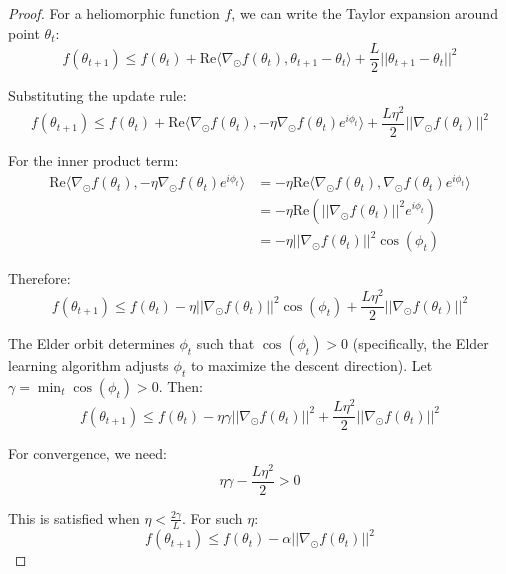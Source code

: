 \begin{proof}
For a heliomorphic function $f$, we can write the Taylor expansion around point $\theta_t$:
\begin{equation}
f(\theta_{t+1}) \leq f(\theta_t) + \text{Re}\langle \nabla_{\odot} f(\theta_t), \theta_{t+1} - \theta_t \rangle + \frac{L}{2}||\theta_{t+1} - \theta_t||^2
\end{equation}

Substituting the update rule:
\begin{equation}
f(\theta_{t+1}) \leq f(\theta_t) + \text{Re}\langle \nabla_{\odot} f(\theta_t), -\eta \nabla_{\odot} f(\theta_t) e^{i\phi_t} \rangle + \frac{L\eta^2}{2}||\nabla_{\odot} f(\theta_t)||^2
\end{equation}

For the inner product term:
\begin{align}
\text{Re}\langle \nabla_{\odot} f(\theta_t), -\eta \nabla_{\odot} f(\theta_t) e^{i\phi_t} \rangle &= -\eta \text{Re}\langle \nabla_{\odot} f(\theta_t), \nabla_{\odot} f(\theta_t) e^{i\phi_t} \rangle \\
&= -\eta \text{Re}\left(||\nabla_{\odot} f(\theta_t)||^2 e^{i\phi_t}\right) \\
&= -\eta ||\nabla_{\odot} f(\theta_t)||^2 \cos(\phi_t)
\end{align}

Therefore:
\begin{equation}
f(\theta_{t+1}) \leq f(\theta_t) - \eta ||\nabla_{\odot} f(\theta_t)||^2 \cos(\phi_t) + \frac{L\eta^2}{2}||\nabla_{\odot} f(\theta_t)||^2
\end{equation}

The Elder orbit determines $\phi_t$ such that $\cos(\phi_t) > 0$ (specifically, the Elder learning algorithm adjusts $\phi_t$ to maximize the descent direction). Let $\gamma = \min_t \cos(\phi_t) > 0$. Then:
\begin{equation}
f(\theta_{t+1}) \leq f(\theta_t) - \eta \gamma ||\nabla_{\odot} f(\theta_t)||^2 + \frac{L\eta^2}{2}||\nabla_{\odot} f(\theta_t)||^2
\end{equation}

For convergence, we need:
\begin{equation}
\eta \gamma - \frac{L\eta^2}{2} > 0
\end{equation}

This is satisfied when $\eta < \frac{2\gamma}{L}$. For such $\eta$:
\begin{equation}
f(\theta_{t+1}) \leq f(\theta_t) - \alpha ||\nabla_{\odot} f(\theta_t)||^2
\end{equation}


\end{proof}
